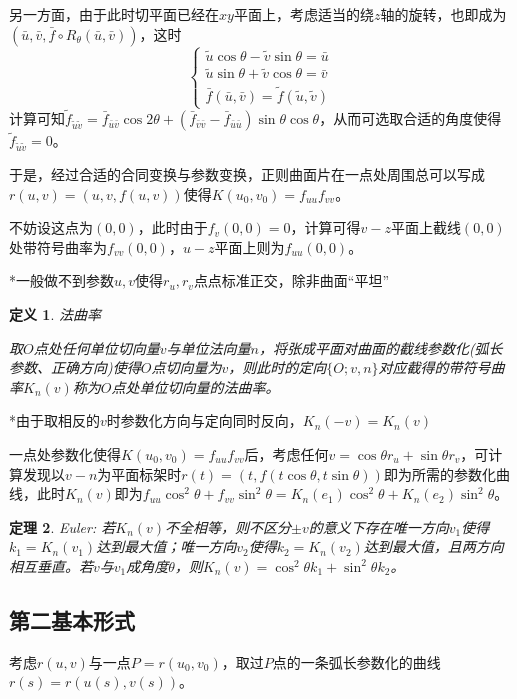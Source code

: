 \documentclass[a4paper,UTF8,fontset=windows]{ctexart}
\newtheorem{thm}{定理}[section]
\newtheorem{dfn}[thm]{定义}
\begin{document}
另一方面，由于此时切平面已经在$xy$平面上，考虑适当的绕$z$轴的旋转，也即成为$(\bar{u},\bar{v},\bar{f}\circ R_\theta(\bar{u},\bar{v}))$，这时
$$\begin{cases}\tilde{u}\cos\theta-\tilde{v}\sin\theta=\bar{u}\\\tilde{u}\sin\theta+\tilde{v}\cos\theta=\bar{v}\\\bar{f}(\bar{u},\bar{v})=\tilde{f}(\tilde{u},\tilde{v})\end{cases}$$
计算可知$\tilde{f}_{\tilde{u}\tilde{v}}=\bar{f}_{\bar{u}\bar{v}}\cos2\theta+(\bar{f}_{\bar{v}\bar{v}}-\bar{f}_{\bar{u}\bar{u}})\sin\theta\cos\theta$，从而可选取合适的角度使得$\tilde{f}_{\tilde{u}\tilde{v}}=0$。

于是，经过合适的合同变换与参数变换，正则曲面片在一点处周围总可以写成$r(u,v)=(u,v,f(u,v))$使得$K(u_0,v_0)=f_{uu}f_{vv}$。

不妨设这点为$(0,0)$，此时由于$f_v(0,0)=0$，计算可得$v-z$平面上截线$(0,0)$处带符号曲率为$f_{vv}(0,0)$，$u-z$平面上则为$f_{uu}(0,0)$。

*一般做不到参数$u,v$使得$r_u,r_v$点点标准正交，除非曲面“平坦”

\begin{dfn} 法曲率

取$O$点处任何单位切向量$v$与单位法向量$n$，将张成平面对曲面的截线参数化(弧长参数、正确方向)使得$O$点切向量为$v$，则此时的定向$\{O;v,n\}$对应截得的带符号曲率$K_n(v)$称为$O$点处单位切向量的法曲率。
\end{dfn}

*由于取相反的$v$时参数化方向与定向同时反向，$K_n(-v)=K_n(v)$

一点处参数化使得$K(u_0,v_0)=f_{uu}f_{vv}$后，考虑任何$v=\cos\theta r_u+\sin\theta r_v$，可计算发现以$v-n$为平面标架时$r(t)=(t,f(t\cos\theta,t\sin\theta))$即为所需的参数化曲线，此时$K_n(v)$即为$f_{uu}\cos^2\theta+f_{vv}\sin^2\theta=K_n(e_1)\cos^2\theta+K_n(e_2)\sin^2\theta$。

\begin{thm}
Euler: 若$K_n(v)$不全相等，则不区分$\pm v$的意义下存在唯一方向$v_1$使得$k_1=K_n(v_1)$达到最大值；唯一方向$v_2$使得$k_2=K_n(v_2)$达到最大值，且两方向相互垂直。若$v$与$v_1$成角度$\theta$，则$K_n(v)=\cos^2\theta k_1+\sin^2\theta k_2$。
\end{thm}

\subsection{第二基本形式}
考虑$r(u,v)$与一点$P=r(u_0,v_0)$，取过$P$点的一条弧长参数化的曲线$r(s)=r(u(s),v(s))$。
\end{document}

